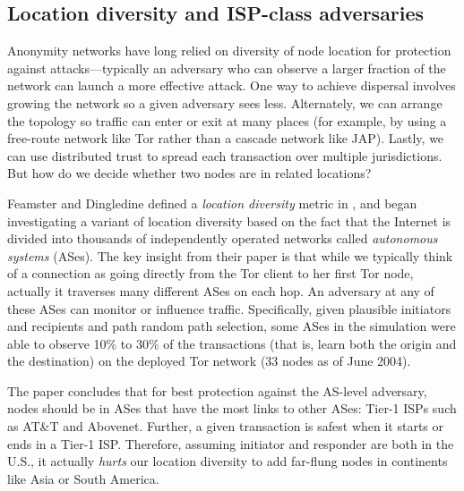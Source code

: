 \documentclass{llncs}
\begin{document}
\subsection{Location diversity and ISP-class adversaries}
\label{subsec:routing-zones}

Anonymity networks have long relied on diversity of node location for
protection against attacks---typically an adversary who can observe a
larger fraction of the network can launch a more effective attack. One
way to achieve dispersal involves growing the network so a given adversary
sees less. Alternately, we can arrange the topology so traffic can enter
or exit at many places (for example, by using a free-route network
like Tor rather than a cascade network like JAP). Lastly, we can use
distributed trust to spread each transaction over multiple jurisdictions.
But how do we decide whether two nodes are in related locations?

Feamster and Dingledine defined a \emph{location diversity} metric
in \cite{feamster:wpes2004}, and began investigating a variant of location
diversity based on the fact that the Internet is divided into thousands of
independently operated networks called {\em autonomous systems} (ASes).
The key insight from their paper is that while we typically think of a
connection as going directly from the Tor client to her first Tor node,
actually it traverses many different ASes on each hop. An adversary at
any of these ASes can monitor or influence traffic. Specifically, given
plausible initiators and recipients and path random path selection,
some ASes in the simulation were able to observe 10\% to 30\% of the
transactions (that is, learn both the origin and the destination) on
the deployed Tor network (33 nodes as of June 2004).

The paper concludes that for best protection against the AS-level
adversary, nodes should be in ASes that have the most links to other ASes:
Tier-1 ISPs such as AT\&T and Abovenet. Further, a given transaction
is safest when it starts or ends in a Tier-1 ISP. Therefore, assuming
initiator and responder are both in the U.S., it actually \emph{hurts}
our location diversity to add far-flung nodes in continents like Asia
or South America.
\end{document}
